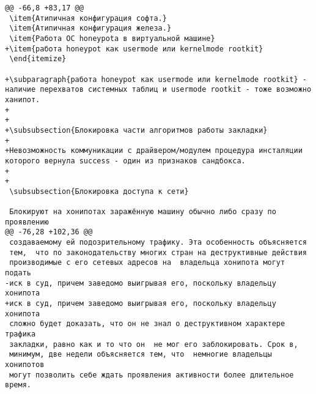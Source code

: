 \begin{verbatim}
@@ -66,8 +83,17 @@
 \item{Атипичная конфигурация софта.}
 \item{Атипичная конфигурация железа.}
 \item{Работа ОС honeypotа в виртуальной машине}
+\item{работа honeypot как usermode или kernelmode rootkit}
 \end{itemize}

+\subparagraph{работа honeypot как usermode или kernelmode rootkit} - наличие перехватов системных таблиц и usermode rootkit - тоже возможно ханипот.
+
+
+\subsubsection{Блокировка части алгоритмов работы закладки}
+
+Невозможность коммуникации с драйвером/модулем процедура инсталяции которого вернула success - один из признаков сандбокса.
+
+
 \subsubsection{Блокировка доступа к сети}

 Блокируют на хонипотах заражённую машину обычно либо сразу по проявлению
@@ -76,28 +102,36 @@
 создаваемому ей подозрительному трафику. Эта особенность объясняется
 тем,  что по законодательству многих стран на деструктивные действия
 производимые с его сетевых адресов на  владельца хонипота могут подать
-иск в суд, причем заведомо выигрывая его, поскольку владельцу хонипота
+иск в суд, причем заведомо выигрывая его, поскольку владельцу хонипота
 сложно будет доказать, что он не знал о деструктивном характере трафика
 закладки, равно как и то что он  не мог его заблокировать. Срок в,
 минимум, две недели объясняется тем, что  немногие владельцы хонипотов
 могут позволить себе ждать проявления активности более длительное время.


\end{verbatim}

